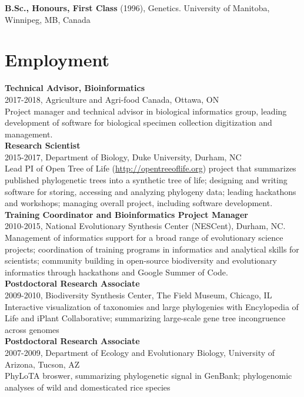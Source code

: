 \documentclass[10pt]{article}
\begin{document}
{\bf B.Sc., Honours, First Class} (1996), Genetics. University of Manitoba, Winnipeg, MB, Canada \\

\section*{Employment}

\noindent \textbf{Technical Advisor, Bioinformatics} \\
2017-2018, Agriculture and Agri-food Canada, Ottawa, ON \\
Project manager and technical advisor in biological informatics group, leading development of software for biological specimen collection digitization and management.\\

\noindent \textbf{Research Scientist} \\
2015-2017, Department of Biology, Duke University, Durham, NC \\
Lead PI of Open Tree of Life (\url{http://opentreeoflife.org}) project that summarizes published phylogenetic trees into a synthetic tree of life; designing and writing software for storing, accessing and analyzing phylogeny data; leading hackathons and workshops; managing overall project, including software development. \\

\noindent \textbf{Training Coordinator and Bioinformatics Project Manager} \\
2010-2015, National Evolutionary Synthesis Center (NESCent), Durham, NC. \\
Management of informatics support for a broad range of evolutionary science projects; coordination of training programs in informatics and analytical skills for scientists; community building in open-source biodiversity and evolutionary informatics through hackathons and Google Summer of Code. \\

\noindent \textbf{Postdoctoral Research Associate} \\
2009-2010, Biodiversity Synthesis Center, The Field Museum, Chicago, IL  \\
Interactive visualization of taxonomies and large phylogenies with Encylopedia of Life and iPlant Collaborative; summarizing large-scale gene tree incongruence across genomes \\

\noindent \textbf{Postdoctoral Research Associate} \\
2007-2009, Department of Ecology and Evolutionary Biology, University of Arizona, Tucson, AZ \\
PhyLoTA broswer, summarizing phylogenetic signal in GenBank; phylogenomic analyses of wild and domesticated rice species \\ 
\end{document}

